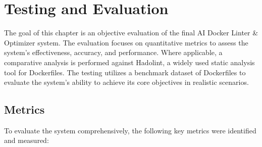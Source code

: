 \chapter{Testing and Evaluation}
\label{chap:eval}
The goal of this chapter is an objective evaluation of the final AI Docker Linter \& Optimizer system. The evaluation focuses on quantitative metrics to assess the system's effectiveness, accuracy, and performance. Where applicable, a comparative analysis is performed against Hadolint, a widely used static analysis tool for Dockerfiles. The testing utilizes a benchmark dataset of Dockerfiles to evaluate the system's ability to achieve its core objectives in realistic scenarios.

\section{Metrics}
\label{sec:eval_metrics}
To evaluate the system comprehensively, the following key metrics were identified and measured:

